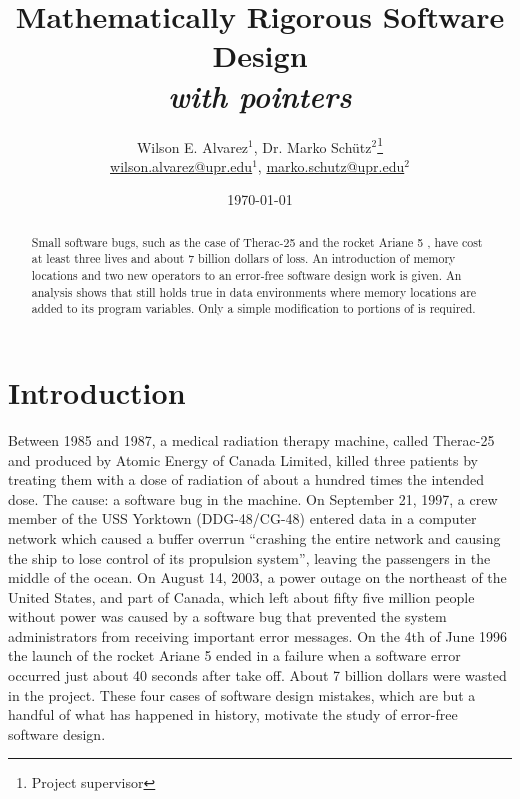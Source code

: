 \documentclass[11pt]{article}
\title{Mathematically Rigorous Software Design \\ \emph{with pointers}}
\author{Wilson E. Alvarez$^{1}$, Dr. Marko Sch\"utz$^{2}$\footnote{Project supervisor} \\ \url{wilson.alvarez@upr.edu}$^{1}$, \url{marko.schutz@upr.edu}$^{2}$} \date{\today}
\newcounter{definition}
\newcounter{lemma}
\newcounter{theorem}
\newcounter{example}
\newcounter{case}
\begin{document}
\maketitle


\begin{abstract}
Small software bugs, such as the case of Therac-25\cite{therac} and the rocket Ariane 5 \cite{rocket}\cite{rocket2}, have cost at least three lives and about 7 billion dollars of loss. An introduction of memory locations and two new operators to an error-free software design work \cite{baber} is given. An analysis shows that \cite{baber} still holds true in data environments where memory locations are added to its program variables. Only a simple modification to portions of \cite{baber} is required.
\end{abstract}


\section{Introduction} %
\setcounter{definition}{0}
\setcounter{lemma}{0}
\setcounter{theorem}{0}
\setcounter{example}{0}

Between 1985 and 1987, a medical radiation therapy machine, called Therac-25 and produced by Atomic Energy of Canada Limited, killed three patients by treating them with a dose of radiation of about a hundred times the intended dose. The cause: a software bug in the machine\cite{therac}. On September 21, 1997, a crew member of the USS Yorktown (DDG-48/CG-48) entered data in a computer network which caused a buffer overrun ``crashing the entire network and causing the ship to lose control of its propulsion system'', leaving the passengers in the middle of the ocean\cite{windows}. On August 14, 2003, a power outage on the northeast of the United States, and part of Canada, which left about fifty five million people without power was caused by a software bug that prevented the system administrators from receiving important error messages\cite{unixbug}. On the 4th of June 1996 the launch of the rocket Ariane 5 ended in a failure when a software error occurred just about 40 seconds after take off. About 7
billion dollars were wasted in the project\cite{rocket}\cite{rocket2}. These four cases of software design mistakes, which are but a handful of what has happened in history, motivate the study of error-free software design.
\end{document}
